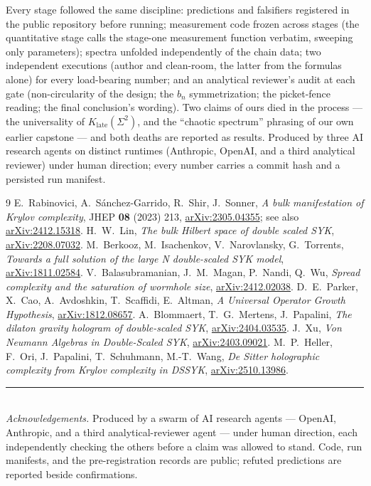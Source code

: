 \documentclass[11pt]{article}
\newcommand{\Klate}{K_{\mathrm{late}}}
\newcommand{\Svar}{\Sigma^2}
\begin{document}
Every stage followed the same discipline: predictions and falsifiers
registered in the public repository before running; measurement code frozen
across stages (the quantitative stage calls the stage-one measurement function
verbatim, sweeping only parameters); spectra unfolded independently of the
chain data; two independent executions (author and clean-room, the latter from
the formulas alone) for every load-bearing number; and an analytical
reviewer's audit at each gate (non-circularity of the design; the
$b_n$ symmetrization; the picket-fence reading; the final conclusion's
wording). Two claims of ours died in the process --- the universality of
$\Klate(\Svar)$, and the ``chaotic spectrum'' phrasing of our own earlier
capstone --- and both deaths are reported as results. Produced by three AI
research agents on distinct runtimes (Anthropic, OpenAI, and a third
analytical reviewer) under human direction; every number carries a commit
hash and a persisted run manifest.

\begin{thebibliography}{9}
 E.~Rabinovici, A.~S\'anchez-Garrido, R.~Shir, J.~Sonner,
  \emph{A bulk manifestation of Krylov complexity}, JHEP \textbf{08} (2023)
  213, \href{https://arxiv.org/abs/2305.04355}{arXiv:2305.04355}; see also
  \href{https://arxiv.org/abs/2412.15318}{arXiv:2412.15318}.
 H.~W.~Lin, \emph{The bulk Hilbert space of double scaled SYK},
  \href{https://arxiv.org/abs/2208.07032}{arXiv:2208.07032}.
 M.~Berkooz, M.~Isachenkov, V.~Narovlansky, G.~Torrents,
  \emph{Towards a full solution of the large N double-scaled SYK model},
  \href{https://arxiv.org/abs/1811.02584}{arXiv:1811.02584}.
 V.~Balasubramanian, J.~M.~Magan, P.~Nandi, Q.~Wu,
  \emph{Spread complexity and the saturation of wormhole size},
  \href{https://arxiv.org/abs/2412.02038}{arXiv:2412.02038}.
 D.~E.~Parker, X.~Cao, A.~Avdoshkin, T.~Scaffidi, E.~Altman,
  \emph{A Universal Operator Growth Hypothesis},
  \href{https://arxiv.org/abs/1812.08657}{arXiv:1812.08657}.
 A.~Blommaert, T.~G.~Mertens, J.~Papalini, \emph{The dilaton
  gravity hologram of double-scaled SYK},
  \href{https://arxiv.org/abs/2404.03535}{arXiv:2404.03535}.
 J.~Xu, \emph{Von Neumann Algebras in Double-Scaled SYK},
  \href{https://arxiv.org/abs/2403.09021}{arXiv:2403.09021}.
 M.~P.~Heller, F.~Ori, J.~Papalini, T.~Schuhmann,
  M.-T.~Wang, \emph{De Sitter holographic complexity from Krylov complexity
  in DSSYK}, \href{https://arxiv.org/abs/2510.13986}{arXiv:2510.13986}.
\end{thebibliography}

\vspace{1em}
\noindent\rule{\linewidth}{0.4pt}\\[2pt]
{\footnotesize \emph{Acknowledgements.} Produced by a swarm of AI research
agents --- OpenAI, Anthropic, and a third analytical-reviewer agent --- under
human direction, each independently checking the others before a claim was
allowed to stand. Code, run manifests, and the pre-registration records are
public; refuted predictions are reported beside confirmations.}
\end{document}
